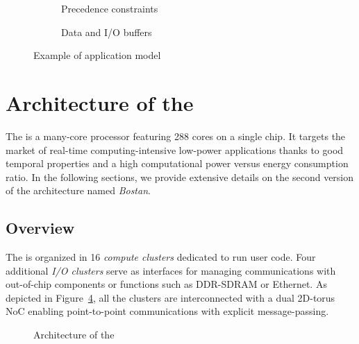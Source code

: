 \documentclass[main.tex]{subfiles}
\begin{document}
\begin{example}
    \begin{figure}
        \centering
        \begin{subfigure}[b]{0.49\linewidth}
            \centering
            
            \caption{Precedence constraints}
            \label{fig_all_appModelPrecs}
        \end{subfigure}
        \begin{subfigure}[b]{0.49\linewidth}
            \centering
            
            \caption{Data and I/O buffers}
            \label{fig_all_appModelDataflow}
        \end{subfigure}
        \caption{Example of application model}
        \label{fig_stateOfTheArt_2_appModelExample}
    \end{figure}
\end{example}


\section{Architecture of the \mppalong}
\label{sec_systemModel_archiMppa}

The \mppalong \cite{kalray_mppa} is a many-core processor featuring 288 cores
on a single chip. It targets the market of real-time computing-intensive
low-power applications thanks to good temporal properties and a high
computational power versus energy consumption ratio. In the following sections,
we provide extensive details on the second version of the \mppalong
architecture named \emph{Bostan}.

\subsection{Overview}
The \mppalong is organized in 16 \emph{compute clusters} dedicated to run user
code. Four additional \emph{I/O clusters} serve as interfaces for managing
communications with out-of-chip components or functions such as DDR-SDRAM or
Ethernet. As depicted in Figure~\ref{fig_execModel_MPPANoCtopology}, all the
clusters are interconnected with a dual 2D-torus NoC enabling point-to-point
communications with explicit message-passing. 

\begin{figure}
    \centering
    \scalebox{1.5}{}
    \caption{Architecture of the \mppalong}
    \label{fig_execModel_MPPANoCtopology}
\end{figure} 
\end{document}
